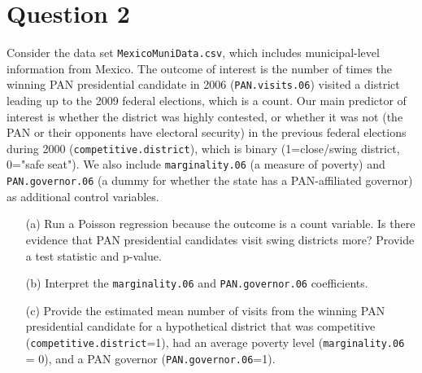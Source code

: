\documentclass[12pt,letterpaper]{article}
\begin{document}
\section*{Question 2} 
\vspace{.25cm}

\noindent Consider the data set \texttt{MexicoMuniData.csv}, which includes municipal-level information from Mexico. The outcome of interest is the number of times the winning PAN presidential candidate in 2006 (\texttt{PAN.visits.06}) visited a district leading up to the 2009 federal elections, which is a count. Our main predictor of interest is whether the district was highly contested, or whether it was not (the PAN or their opponents have electoral security) in the previous federal elections during 2000 (\texttt{competitive.district}), which is binary (1=close/swing district, 0="safe seat"). We also include \texttt{marginality.06} (a measure of poverty) and \texttt{PAN.governor.06} (a dummy for whether the state has a PAN-affiliated governor) as additional control variables. 

\begin{enumerate}
	\item [(a)]
	Run a Poisson regression because the outcome is a count variable. Is there evidence that PAN presidential candidates visit swing districts more? Provide a test statistic and p-value.

	\item [(b)]
	Interpret the \texttt{marginality.06} and \texttt{PAN.governor.06} coefficients.
	
	\item [(c)]
	Provide the estimated mean number of visits from the winning PAN presidential candidate for a hypothetical district that was competitive (\texttt{competitive.district}=1), had an average poverty level (\texttt{marginality.06} = 0), and a PAN governor (\texttt{PAN.governor.06}=1).
	
\end{enumerate}
\end{document}

